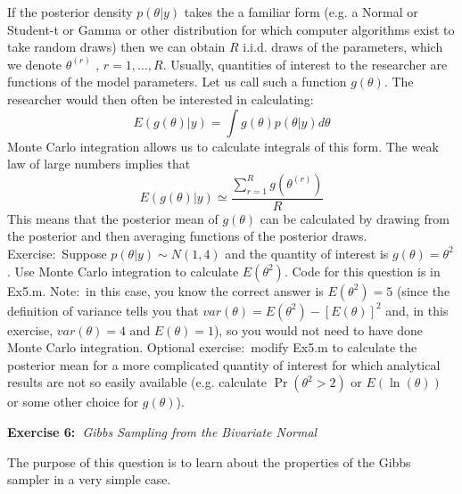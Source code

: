 \documentclass{article}
\begin{document}
If the posterior density $p\left( \theta |y\right) $ takes the a familiar
form (e.g. a Normal or Student-t or Gamma or other distribution for which
computer algorithms exist to take random draws) then we can obtain $R$
i.i.d. draws of the parameters, which we denote $\theta ^{\left( r\right) }$%
, $r=1,...,R$. Usually, quantities of interest to the researcher are
functions of the model parameters. Let us call such a function $g\left(
\theta \right) $. The researcher would then often be interested in
calculating:%
\begin{equation*}
E\left( g\left( \theta \right) |y\right) =\int g\left( \theta \right)
p\left( \theta |y\right) d\theta
\end{equation*}%
Monte Carlo integration allows us to calculate integrals of this form. The
weak law of large numbers implies that%
\begin{equation*}
E\left( g\left( \theta \right) |y\right) \simeq \frac{\sum_{r=1}^{R}g\left(
\theta ^{\left( r\right) }\right) }{R}
\end{equation*}%
This means that the posterior mean of $g\left( \theta \right) $ can be
calculated by drawing from the posterior and then averaging functions of the
posterior draws. Exercise:\ Suppose $p\left( \theta |y\right) \sim N(1,4)$
and the quantity of interest is $g\left( \theta \right) =\theta ^{2}$. Use
Monte Carlo integration to calculate $E\left( \theta ^{2}\right) $. Code for
this question is in Ex5.m. Note:\ in this case, you know the correct answer
is $E\left( \theta ^{2}\right) =5$ (since the definition of variance tells
you that $var\left( \theta \right) =E\left( \theta ^{2}\right) -\left[
E\left( \theta \right) \right] ^{2}$ and, in this exercise, $var\left(
\theta \right) =4$ and $E\left( \theta \right) =1$), so you would not need
to have done Monte Carlo integration. Optional exercise:\ modify Ex5.m to
calculate the posterior mean for a more complicated quantity of interest for
which analytical results are not so easily available (e.g. calculate $\Pr
\left( \theta ^{2}>2\right) $ or $E\left( \ln \left( \theta \right) \right) $
or some other choice for $g\left( \theta \right) $).\bigskip

\textbf{Exercise 6:\ }\textit{Gibbs Sampling from the Bivariate Normal }

The purpose of this question is to learn about the properties of the Gibbs
sampler in a very simple case.
\end{document}
